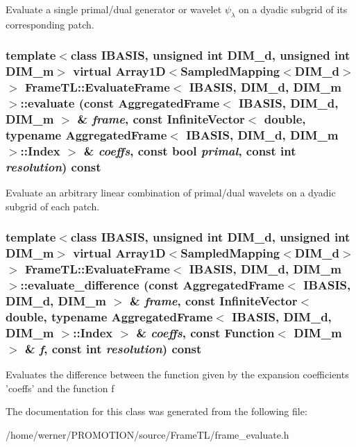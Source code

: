 Evaluate a single primal/dual generator or wavelet $\psi_\lambda$ on a dyadic subgrid of its corresponding patch. \hypertarget{classFrameTL_1_1EvaluateFrame_e7bdc20b6e85b3c4a81511a234040467}{
\subsubsection[evaluate]{\setlength{\rightskip}{0pt plus 5cm}template$<$class IBASIS, unsigned int DIM\_\-d, unsigned int DIM\_\-m$>$ virtual Array1D$<$SampledMapping$<$DIM\_\-d$>$ $>$ {\bf FrameTL::EvaluateFrame}$<$ IBASIS, DIM\_\-d, DIM\_\-m $>$::evaluate (const {\bf AggregatedFrame}$<$ IBASIS, DIM\_\-d, DIM\_\-m $>$ \& {\em frame}, \/  const InfiniteVector$<$ double, typename {\bf AggregatedFrame}$<$ IBASIS, DIM\_\-d, DIM\_\-m $>$::Index $>$ \& {\em coeffs}, \/  const bool {\em primal}, \/  const int {\em resolution}) const}}
\label{classFrameTL_1_1EvaluateFrame_e7bdc20b6e85b3c4a81511a234040467}


Evaluate an arbitrary linear combination of primal/dual wavelets on a dyadic subgrid of each patch. \hypertarget{classFrameTL_1_1EvaluateFrame_c61439dafa2ec4fa0793589ee3a84751}{
\subsubsection[evaluate\_\-difference]{\setlength{\rightskip}{0pt plus 5cm}template$<$class IBASIS, unsigned int DIM\_\-d, unsigned int DIM\_\-m$>$ virtual Array1D$<$SampledMapping$<$DIM\_\-d$>$ $>$ {\bf FrameTL::EvaluateFrame}$<$ IBASIS, DIM\_\-d, DIM\_\-m $>$::evaluate\_\-difference (const {\bf AggregatedFrame}$<$ IBASIS, DIM\_\-d, DIM\_\-m $>$ \& {\em frame}, \/  const InfiniteVector$<$ double, typename {\bf AggregatedFrame}$<$ IBASIS, DIM\_\-d, DIM\_\-m $>$::Index $>$ \& {\em coeffs}, \/  const Function$<$ DIM\_\-m $>$ \& {\em f}, \/  const int {\em resolution}) const}}
\label{classFrameTL_1_1EvaluateFrame_c61439dafa2ec4fa0793589ee3a84751}


Evaluates the difference between the function given by the expansion coefficients 'coeffs' and the function f 

The documentation for this class was generated from the following file:\begin{CompactItemize}
\item 
/home/werner/PROMOTION/source/FrameTL/frame\_\-evaluate.h\end{CompactItemize}
